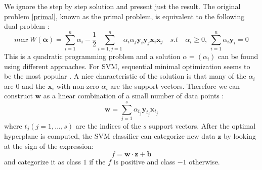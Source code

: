 \documentclass[a4paper,11pt,oneside]{article}
\begin{document}
We ignore the step by step solution and present just the result. The original problem \ref{primal}, known as the primal problem,
is equivalent to the following dual problem \cite{law2006simple}:
\begin{equation}
  max \ W(\mathbf{\alpha}) = \sum_{i=1}^n \alpha_i - \frac{1}{2} \sum_{i=1,j=1}^n \alpha_i \alpha_j \mathbf{y}_i\mathbf{y}_j\mathbf{x}_i\mathbf{x}_j
  \quad s.t \quad \alpha_i \geq 0,\ \sum_{i=1}^n \alpha_i\mathbf{y}_i = 0
\end{equation}
This is a quadratic programming problem and a solution $\alpha=(\alpha_i)$ can be found using different approaches.
For SVM, sequential minimal optimization seems to be the most popular \cite{law2006simple}. A nice characteristic 
of the solution is that many of the $\alpha_i$ are $0$ and the $\mathbf{x}_i$ with non-zero $\alpha_i$ are the support 
vectors. Therefore we can construct $\mathbf{w}$ as a linear combination of a small number of data points \cite{law2006simple}:
\begin{equation}\label{svm4}
  \mathbf{w} = \sum_{j=1}^s \alpha_{t_j}\mathbf{y}_{t_j}\mathbf{x}_{t_j}
\end{equation}
where $t_j(j=1,...,s)$ are the indices of the $s$ support vectors.
After the optimal hyperplane is computed, the SVM classifier can categorize new data $\mathbf{z}$ by looking at the sign of the expression:
\begin{equation}
  f = \mathbf{w}\cdot\mathbf{z}+\mathbf{b}
\end{equation} and categorize it as class $1$ if the $f$ is positive and class $-1$ otherwise.
\end{document}
